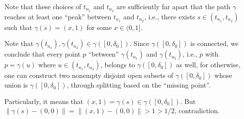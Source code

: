 \begin{enumerate}
\begin{pf}
Note that these choices of \(t_{n_1}\) and \(t_{n_2}\) are sufficiently far
apart that the path \(\gamma\) reaches at least one ``peak'' between
\(t_{n_1}\) and \(t_{n_2}\), i.e., there exists \(s\in(t_{n_1},t_{n_2})\) such
that \(\gamma(s)=(x,1)\) for some \(x\in (0,1]\).

Note that \(\gamma(t_{n_1}),\gamma(t_{n_2})\in \gamma([0,\delta_0])\). Since
\(\gamma([0,\delta_0])\) is connected, we conclude that every point \(p\)
``between'' \(\gamma(t_{n_1})\) and \(\gamma(t_{n_2})\), i.e., \(p\) with
\(p=\gamma(u)\) where \(u\in(t_{n_1},t_{n_2})\), belongs to
\(\gamma([0,\delta_0])\) as well, for otherwise, one can construct two nonempty
disjoint open subsets of \(\gamma([0,\delta_0])\) whose union is
\(\gamma([0,\delta_0])\), through splitting based on the ``missing point''.
\begin{center}
\end{center}

Particularly, it means that \((x,1)=\gamma(s)\in \gamma([0,\delta_0])\). But
\(\|\gamma(s)-(0,0)\|=\|(x,1)-(0,0)\|>1>1/2\), contradiction.
\end{pf}
\end{enumerate}
